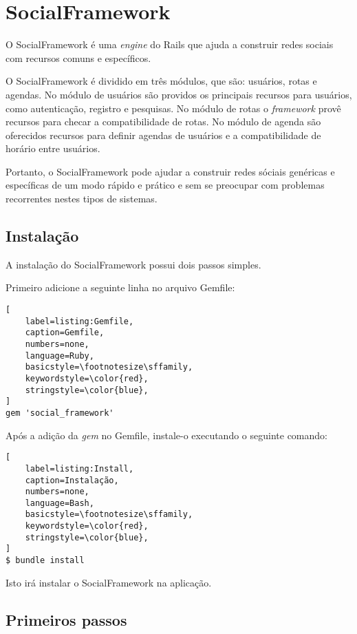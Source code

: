 \chapter{SocialFramework}
\label{chapter:SocialFramework}

O SocialFramework é uma \textit{engine} do Rails que ajuda a construir redes sociais com recursos comuns e específicos.

O SocialFramework é dividido em três módulos, que são: usuários, rotas e agendas. No módulo de usuários são providos os principais recursos para usuários, como autenticação, registro e pesquisas. No módulo de rotas o \textit{framework} provê recursos para checar a compatibilidade de rotas. No módulo de agenda são oferecidos recursos para definir agendas de usuários e a compatibilidade de horário entre usuários.

Portanto, o SocialFramework pode ajudar a construir redes sóciais genéricas e específicas de um modo rápido e prático e sem se preocupar com problemas recorrentes nestes tipos de sistemas.

\section{Instalação}

A instalação do SocialFramework possui dois passos simples.

Primeiro adicione a seguinte linha no arquivo Gemfile:

\begin{lstlisting}[
    label=listing:Gemfile,
    caption=Gemfile,
    numbers=none,
    language=Ruby,
    basicstyle=\footnotesize\sffamily,
    keywordstyle=\color{red},
    stringstyle=\color{blue},
]
gem 'social_framework'
\end{lstlisting}

Após a adição da \textit{gem} no Gemfile, instale-o executando o seguinte comando:

\begin{lstlisting}[
    label=listing:Install,
    caption=Instalação,
    numbers=none,
    language=Bash,
    basicstyle=\footnotesize\sffamily,
    keywordstyle=\color{red},
    stringstyle=\color{blue},
]
$ bundle install
\end{lstlisting}

Isto irá instalar o SocialFramework na aplicação.

\section{Primeiros passos}

